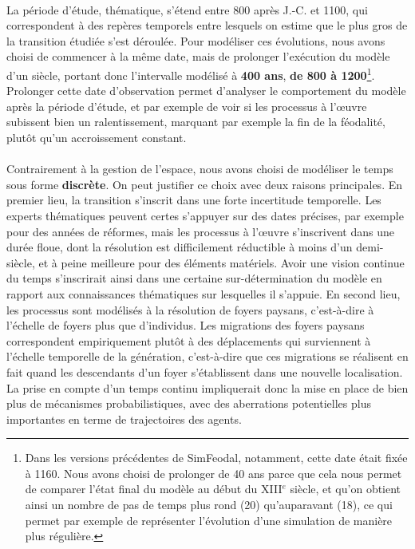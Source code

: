 \paragraph[Durée]{} La période d'étude, thématique, s'étend entre 800 après J.-C. et 1100, qui correspondent à des repères temporels entre lesquels on estime que le plus gros de la transition étudiée s'est déroulée.
Pour modéliser ces évolutions, nous avons choisi de commencer à la même date, mais de prolonger l'exécution du modèle d'un siècle, portant donc l'intervalle modélisé à \textbf{400 ans}, \textbf{de 800 à 1200}\footnote{
	Dans les versions précédentes de SimFeodal, \textcite{cura_transition_2017} notamment, cette date était fixée à 1160. Nous avons choisi de prolonger de 40 ans parce que cela nous permet de comparer l'état final du modèle au début du XIII$^e$ siècle, et qu'on obtient ainsi un nombre de pas de temps plus \og rond\fg{} (20) qu'auparavant (18), ce qui permet par exemple de représenter l'évolution d'une simulation de manière plus régulière.
}. Prolonger cette date d'observation permet d'analyser le comportement du modèle après la période d'étude, et par exemple de voir si les processus à l'œuvre subissent bien un ralentissement, marquant par exemple la fin de la féodalité, plutôt qu'un accroissement constant.

\paragraph[Discret]{} Contrairement à la gestion de l'espace, nous avons choisi de modéliser le temps sous forme \textbf{discrète}.
On peut justifier ce choix avec deux raisons principales.
En premier lieu, la transition s'inscrit dans une forte incertitude temporelle. Les experts thématiques peuvent certes s'appuyer sur des dates précises, par exemple pour des années de réformes, mais les processus à l'œuvre s'inscrivent dans une durée floue, dont la résolution est difficilement réductible à moins d'un demi-siècle, et à peine meilleure pour des éléments matériels.
Avoir une vision continue du temps s'inscrirait ainsi dans une certaine sur-détermination du modèle en rapport aux connaissances thématiques sur lesquelles il s'appuie.
En second lieu, les processus sont modélisés à la résolution de \og foyers paysans\fg{}, c'est-à-dire à l'échelle de foyers plus que d'individus. Les migrations des foyers paysans correspondent empiriquement plutôt à des déplacements qui surviennent à l'échelle temporelle de la génération, c'est-à-dire que ces migrations se réalisent en fait quand les descendants d'un foyer s'établissent dans une nouvelle localisation.
La prise en compte d'un temps continu impliquerait donc la mise en place de bien plus de mécanismes probabilistiques, avec des aberrations potentielles plus importantes en terme de trajectoires des agents.

